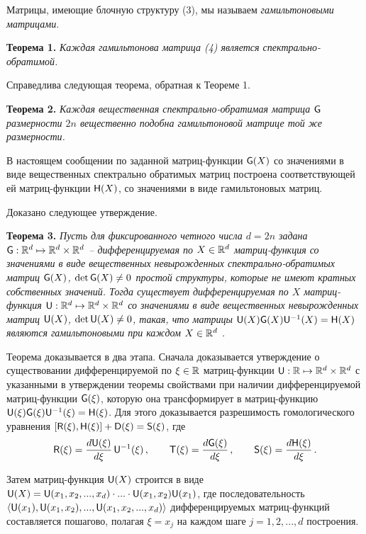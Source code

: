 Матрицы, имеющие блочную структуру (3), мы называем {\it гамильтоновыми матрицами}.

\textbf{Теорема 1.} {\it Каждая гамильтонова матрица (4) является спектрально-обратимой.}
\smallskip

Справедлива следующая теорема, обратная к Теореме 1.
\smallskip

\textbf{Теорема 2.} {\it Каждая вещественная спектрально-обратимая матрица ${\sf G}$ размерности $2n$ вещественно подобна гамильтоновой матрице той же размерности.}
\smallskip

В настоящем сообщении  по заданной матриц-функ\-ции ${\sf G}(X)$ со значениями в виде вещественных спектрально обратимых матриц построена соответствующей ей  матриц-функции ${\sf H}(X)$, со значениями в виде  гамильтоновых матриц.

Доказано следующее утверждение.
\smallskip

\textbf{Теорема 3.} {\it Пусть для фиксированного четного числа $d  = 2n$ задана ${\sf G}: {\Bbb R}^d \mapsto {\Bbb R}^d\times {\Bbb R}^d$ -- дифференцируемая по $X \in {\Bbb R}^d$ матриц-фун\-к\-ция со значениями в виде вещественных  невырожденных спектрально-обратимых матриц  ${\sf G}(X)$, $\det {\sf G}(X) \ne 0$ простой структуры, которые не имеют кратных собственных значений. Тогда существует дифференцируемая по $X$ матриц-фун\-к\-ция ${\sf U}: {\Bbb R}^{d} \mapsto {\Bbb R}^d \times {\Bbb R}^d$ со значениями в виде вещественных невырожденных матриц ${\sf U}(X)$,  $\det {\sf U}(X) \ne 0$, такая, что матрицы ${\sf U}(X){\sf  G}(X){\sf U}^{-1}(X) =  {\sf H} (X)$ являются гамильтоновыми при каждом $X \in {\Bbb R}^d$ .}
\smallskip

Теорема доказывается в два этапа. Сначала  доказывается утверждение о существовании дифференцируемой  по $\xi \in {\Bbb R}$ матриц-функции ${\sf U}: {\Bbb R} \mapsto {\Bbb R}^d \times {\Bbb R}^d$ с указанными в утверждении теоремы свойствами при наличии дифференцируемой матриц-функции ${\sf G}(\xi)$, которую она трансформирует в матриц-функцию  ${\sf U}(\xi){\sf  G}(\xi){\sf U}^{-1}(\xi) =  {\sf H} (\xi)$. Для этого доказывается разрешимость гомологического уравнения $[{\sf R}(\xi), {\sf H}(\xi)] + {\sf D}(\xi) = {\sf S}(\xi)$, где
$${\sf R}(\xi) = \frac {d {\sf U}(\xi)}{d \xi}\,{\sf U}^{-1}(\xi) \,, \qquad {\sf T}(\xi) = \frac {d {\sf G}(\xi)}{d \xi}\,, \qquad {\sf S}(\xi) = \frac {d {\sf H}(\xi)}{d \xi}\,. $$

Затем матриц-функция ${\sf U}(X)$ строится в виде ${\sf U}(X) = {\sf U}(x_1, x_2, ..., x_d) \cdot ... \cdot {\sf U}(x_1, x_2) {\sf U}(x_1)$, где последовательность $\langle {\sf U}(x_1), {\sf U}(x_1, x_2), ..., {\sf U}(x_1, x_2, ..., x_d)\rangle$  дифференцируемых  мат\-риц-функций  составляется пошагово, полагая $\xi = x_j$ на каждом шаге $j = 1, 2, ..., d$ построения.
\smallskip

